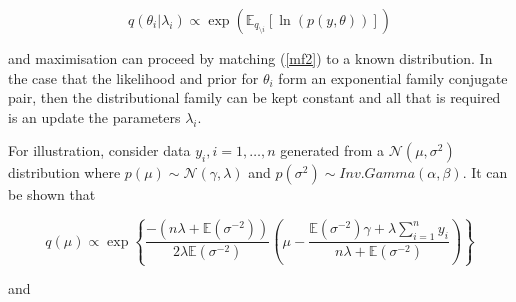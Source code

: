 \documentclass{article}\usepackage[]{graphicx}\usepackage[]{color}
\begin{document}
\begin{equation}
\label{mf2}
q(\theta_i | \lambda_i) \propto\exp( \mathbb{E}_{q_{\setminus i}} [\ln(p(y,\theta))])
\end{equation}

and maximisation can proceed by matching (\ref{mf2}) to a known distribution. In the case that the likelihood and prior for $\theta_i$ form an exponential family conjugate pair, then the distributional family can be kept constant and all that is required is an update the parameters $\lambda_i$.

For illustration, consider data $y_i, i = 1, \dots, n$ generated from a $\mathcal{N}(\mu, \sigma^2)$ distribution where $p(\mu) \sim \mathcal{N}(\gamma, \lambda)$ and $p(\sigma^2) \sim Inv.Gamma(\alpha, \beta)$. It can be shown that

\begin{equation}
\label{mf3}
q(\mu) \propto \exp \left\{ \frac{-(n\lambda + \mathbb{E}(\sigma^{-2}))}{2\lambda\mathbb{E}(\sigma^{-2})} \left( \mu - \frac{\mathbb{E}(\sigma^{-2})\gamma + \lambda \sum_{i=1}^{n} y_i}{n \lambda + \mathbb{E}(\sigma^{-2})} \right) \right\}
\end{equation}

and
\end{document}
